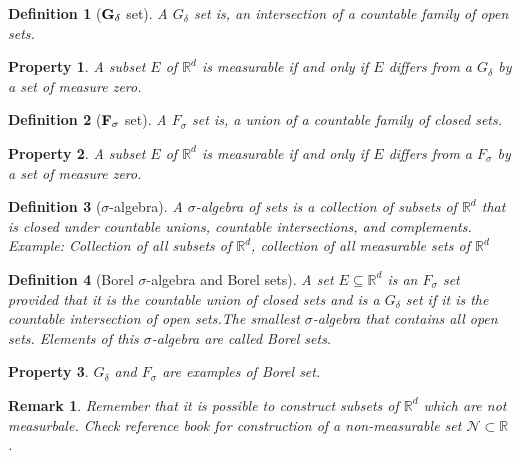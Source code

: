 \documentclass{report}
\theoremstyle{upthm}
\newtheorem{defn}{Definition}
\newtheorem{remark}{Remark}
\newtheorem{property}{Property}
\newcommand{\reals}{\mathbb{R}}
\newcommand{\calN}{{\mathcal{N}}}
\begin{document}
\begin{defn}[$\bf G_\delta$ set]
	A $G_\delta$ set is, an intersection of a countable family of open sets.
\end{defn}

\begin{property}
	A subset $E$ of $\reals^d$ is measurable if and only if $E$ differs from a $G_\delta$ by a set of measure zero.
\end{property}

\begin{defn}[$\bf F_\sigma$ set]
	A $F_\sigma$ set is, a union of a countable family of closed sets.
\end{defn}


\begin{property}
	A subset $E$ of $\reals^d$ is measurable if and only if $E$ differs from a $F_\sigma$ by a set of measure zero.
\end{property}

\begin{defn}[$\sigma$-algebra]
	A $\sigma$-algebra of sets is a collection of subsets of $\reals^d$ that is closed under countable unions, countable intersections, and complements. Example: Collection of all subsets of $\reals^d$, collection of all measurable sets of $\reals^d$
\end{defn}
\begin{defn}[Borel $\sigma$-algebra and Borel sets]
	A set $E \subseteq \reals^d $ is an $F_\sigma$ set provided that it is the countable union of closed	sets and is a $G_\delta$ set if it is the countable intersection of open sets.The smallest $\sigma$-algebra that contains all open sets. Elements of this $\sigma$-algebra are called	Borel sets.
\end{defn}

\begin{property}
	$G_\delta$ and $F_\sigma$ are examples of Borel set.
\end{property}

\begin{remark}
	Remember that it is possible to construct subsets of $\reals^d$ which are not measurbale. Check reference book for construction of a non-measurable set $\calN \subset \reals$. 
\end{remark}
\end{document}
